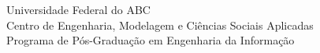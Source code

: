   \begin{capa}%
    \center
	\ABNTEXchapterfont\large{Universidade Federal do ABC \\ Centro de Engenharia, Modelagem e Ciências Sociais Aplicadas \\ Programa de Pós-Graduação em Engenharia da Informação}

    \vfill
    \ABNTEXchapterfont\bfseries\LARGE\imprimirtitulo
    \vfill

	\ABNTEXchapterfont\large\imprimirautor
	\vfill
%
	
    \large\imprimirlocal \\ \large\imprimirdata

    \vspace*{1cm}
  \end{capa}
